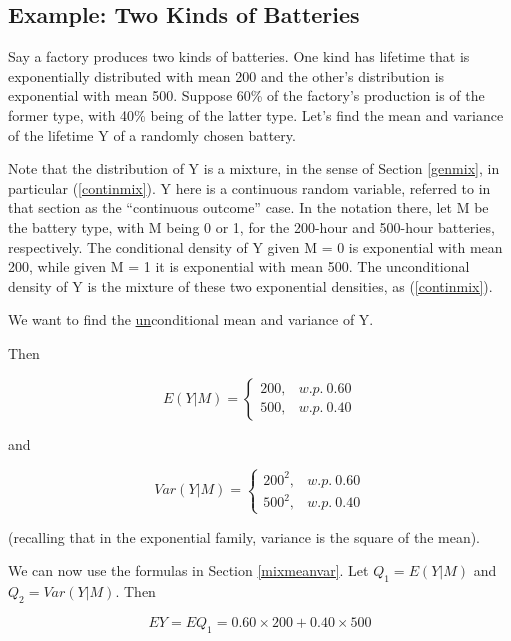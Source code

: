 \documentclass[11pt]{article}
\begin{document}
\subsection{Example:  Two Kinds of Batteries}

Say a factory produces two kinds of batteries.  One kind has lifetime
that is exponentially distributed with mean 200 and the other's
distribution is exponential with mean 500.  Suppose 60\% of the
factory's production is of the former type, with 40\% being of the
latter type.  Let's find the mean and variance of the lifetime Y of a
randomly chosen battery.

Note that the distribution of Y is a mixture, in the sense of Section
\ref{genmix}, in particular (\ref{continmix}).  Y here is a continuous
random variable, referred to in that section as the ``continuous
outcome'' case.   In the notation there, let M be the battery type, with
M being 0 or 1, for the 200-hour and 500-hour batteries, respectively.
The conditional density of Y given M = 0 is exponential with mean 200,
while given M = 1 it is exponential with mean 500.  The unconditional
density of Y is the mixture of these two exponential densities, as 
(\ref{continmix}).

We want to find the \underline{un}conditional mean and variance of Y.

Then

\begin{equation}
\label{batt1}
E(Y|M)=\left\{ \begin{array}{rl}
200, & w.p. ~ 0.60 \\
500, & w.p. ~ 0.40
\end{array}\right. 
\end{equation}

and 

\begin{equation}
\label{batt2}
Var(Y|M)=\left\{ \begin{array}{rl}
200^2, & w.p. ~ 0.60 \\
500^2, & w.p. ~ 0.40
\end{array}\right. 
\end{equation}

(recalling that in the exponential family, variance is the square of the
mean).

We can now use the formulas in Section \ref{mixmeanvar}.  Let $Q_1 =
E(Y|M)$  and $Q_2 = Var(Y|M)$.  Then

\begin{equation}
EY = EQ_1 = 0.60 \times 200 + 0.40 \times 500
\end{equation}
\end{document}
